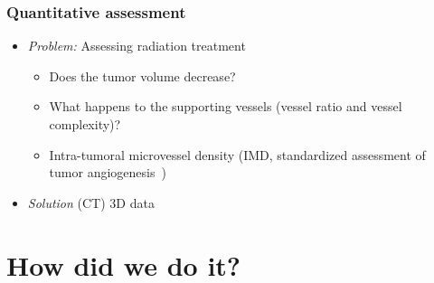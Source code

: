 \documentclass[]{beamer}
\newcommand{\uct}{\si{\micro}CT\xspace} %
\begin{document}
\begin{frame}
	\frametitle{Quantitative assessment}
	\begin{itemize}
		\item \emph{Problem:} Assessing radiation treatment
		\begin{itemize}
			\item Does the tumor volume decrease?
			\item What happens to the supporting vessels (vessel ratio and vessel complexity)?
			\item Intra-tumoral microvessel density (IMD, standardized assessment of tumor angiogenesis~\cite{Hasan2002})
		\end{itemize}
		\pause
		\item \emph{Solution} (\uct) 3D data
	\end{itemize}
\end{frame}

\section{How did we do it?}
\end{document}

